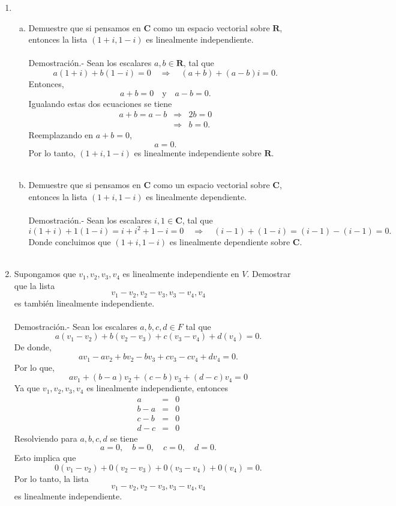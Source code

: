 \begin{enumerate}[\bfseries 1.]
    \item 
	\begin{enumerate}[(a)]

	    \item Demuestre que si pensamos en $\textbf{C}$ como un espacio vectorial sobre $\textbf{R}$, entonces la lista $(1+i,1-i)$ es linealmente independiente.\\\\
		Demostración.-\; Sean los escalares $a,b\in \textbf{R}$, tal que
		$$a(1+i)+b(1-i)=0\quad \Rightarrow \quad (a+b)+(a-b)i=0.$$
		Entonces,
		$$a+b=0\quad \mbox{y}\quad a-b=0.$$
		Igualando estas dos ecuaciones se tiene
		$$
		\begin{array}{rcl}
		    a+b=a-b&\Rightarrow& 2b=0\\
			   &\Rightarrow& b=0.
	       \end{array}
		$$
		Reemplazando en $a+b=0$,
		$$a=0.$$
		Por lo tanto, $(1+i,1-i)$ es linealmente independiente sobre $\textbf{R}$.\\\\


	    \item Demuestre que si pensamos en $\textbf{C}$ como un espacio vectorial sobre $\textbf{C}$, entonces la lista $(1+i,1-i)$ es linealmente dependiente.\\\\
		Demostración.-\; Sean los escalares $i,1\in \textbf{C}$, tal que
		$$i(1+i)+1(1-i)=i+i^2+1-i=0\quad \Rightarrow \quad (i-1)+(1-i)=(i-1)-(i-1)=0.$$
		Donde concluimos que $(1+i,1-i)$ es linealmente dependiente sobre $\textbf{C}$.\\\\

	\end{enumerate}

    \item Supongamos que $v_1,v_2,v_3,v_4$ es linealmente independiente en $V$. Demostrar que la lista
    $$v_1-v_2,v_2-v_3,v_3-v_4,v_4$$
    es también linealmente independiente.\\\\
	Demostración.-\; Sean los escalares $a,b,c,d\in F$ tal que
	$$a(v_1-v_2)+b(v_2-v_3)+c(v_3-v_4)+d(v_4)=0.$$
	De donde,
	$$av_1-av_2+bv_2-bv_3+cv_3-cv_4+dv_4=0.$$
	Por lo que,
	$$av_1+(b-a)v_2+(c-b)v_3+(d-c)v_4=0$$
	Ya que $v_1,v_2,v_3,v_4$ es linealmente independiente, entonces
	$$
	\begin{array}{rcl}
	    a&=& 0\\
	    b-a&=& 0\\
	    c-b&=& 0\\
	    d-c&=& 0
	\end{array}
	$$
	Resolviendo para $a,b,c,d$ se tiene
	$$a=0,\quad b=0,\quad c=0,\quad d=0.$$
	Esto implica que 
	$$0(v_1-v_2)+0(v_2-v_3)+0(v_3-v_4)+0(v_4)=0.$$
	Por lo tanto, la lista
	$$v_1-v_2,v_2-v_3,v_3-v_4,v_4$$
	es linealmente independiente.\\\\


\end{enumerate}
